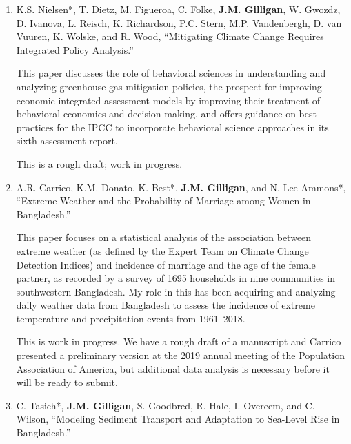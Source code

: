 %
%
\begin{enumerate}
    \item 
    K.S. Nielsen*, T. Dietz, M. Figueroa, C. Folke, \textbf{J.M. Gilligan}, W. Gwozdz, D. Ivanova, L. Reisch, K. Richardson, P.C. Stern, M.P. Vandenbergh, D. van Vuuren, K. Wolske, and R. Wood,
    ``Mitigating Climate Change Requires Integrated Policy Analysis.'' 
    
    This paper discusses the role of behavioral sciences in understanding and analyzing greenhouse gas mitigation policies, the prospect for improving economic
    integrated assessment models by improving their treatment of behavioral economics and decision-making, and offers guidance on best-practices for the IPCC to
    incorporate behavioral science approaches in its sixth assessment report.
    
    This is a rough draft; work in progress.
    
    \item A.R. Carrico, K.M. Donato, K. Best*, \textbf{J.M. Gilligan}, and N. Lee-Ammons*, ``Extreme Weather and the Probability of Marriage among Women in Bangladesh.''
    
    This paper focuses on a statistical analysis of the association between extreme weather (as defined by the Expert Team on Climate Change Detection Indices) and 
    incidence of marriage and the age of the female partner, as recorded by a survey of 1695 households in nine communities in southwestern Bangladesh. My role in this
    has been acquiring and analyzing daily weather data from Bangladesh to assess the incidence of extreme temperature and precipitation events from 1961--2018.
    
    This is work in progress. We have a rough draft of a manuscript and Carrico presented a preliminary version at the 2019 annual meeting of the Population Association of America,
    but additional data analysis is necessary before it will be ready to submit.
    
    
    \item 
    C. Tasich*, \textbf{J.M. Gilligan}, S. Goodbred, R. Hale, I. Overeem, and C. Wilson, ``Modeling Sediment Transport and Adaptation to Sea-Level Rise in Bangladesh.''
%
\end{enumerate}
